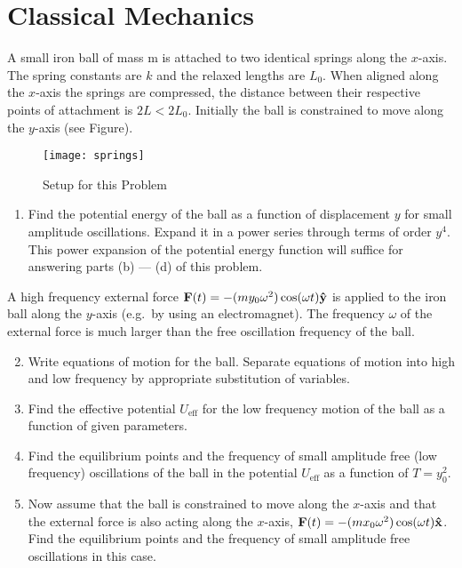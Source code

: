 \section{Classical Mechanics}
\begin{problem}
  A small iron ball of mass m is attached to two identical springs along the $x$-axis. The spring constants are $k$ and the relaxed lengths are $L_0$. When aligned along the $x$-axis the springs are compressed, the distance between their respective points of attachment is $2L<2L_0$. Initially the ball is constrained to move along the $y$-axis (see Figure).
  \begin{figure}[H]
    \centering
    \texttt{[image: springs]}
    \caption{Setup for this Problem}
  \end{figure}
  \begin{enumerate}[label=(\alph*)]
  \item Find the potential energy of the ball as a function of displacement $y$ for small amplitude oscillations. Expand it in a power series through terms of order $y^4$. This power expansion of the potential energy function will suffice for answering parts (b) --- (d) of this problem.
  \end{enumerate}
  A high frequency external force $\vb{F}(t)=-(my_0\omega^2)\cos(\omega t)\vu{y}$ is applied to the iron ball along the $y$-axis (e.g.\ by using an electromagnet). The frequency $\omega$ of the external force is much larger than the free oscillation frequency of the ball.
  \begin{enumerate}[label=(\alph*)]
    \setcounter{enumi}{1}
  \item Write equations of motion for the ball. Separate equations of motion into high and low frequency by appropriate substitution of variables.
  \item Find the effective potential $U_{\text{eff}}$ for the low frequency motion of the ball as a function of given parameters.
  \item Find the equilibrium points and the frequency of small amplitude free (low frequency) oscillations of the ball in the potential $U_{\text{eff}}$ as a function of $T=y_0^2$.
  \item Now assume that the ball is constrained to move along the $x$-axis and that the external force is also acting along the $x$-axis, $\vb{F}(t)=-(mx_0\omega^2)\cos(\omega t)\vu{x}$. Find the equilibrium points and the frequency of small amplitude free oscillations in this case.
  \end{enumerate}
\end{problem}

